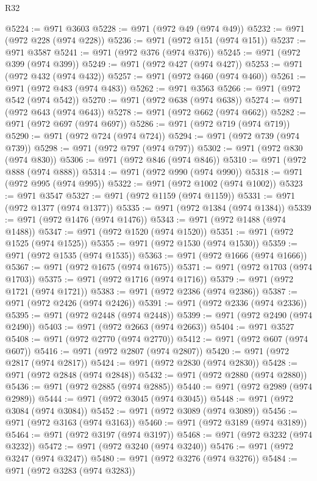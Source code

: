 \begin{lexlean}{R32}
\begin{coremodule}
@5224 := @971 @3603
@5228 := @971 (@972 @49 (@974 @49))
@5232 := @971 (@972 @228 (@974 @228))
@5236 := @971 (@972 @151 (@974 @151))
@5237 := @971 @3587
@5241 := @971 (@972 @376 (@974 @376))
@5245 := @971 (@972 @399 (@974 @399))
@5249 := @971 (@972 @427 (@974 @427))
@5253 := @971 (@972 @432 (@974 @432))
@5257 := @971 (@972 @460 (@974 @460))
@5261 := @971 (@972 @483 (@974 @483))
@5262 := @971 @3563
@5266 := @971 (@972 @542 (@974 @542))
@5270 := @971 (@972 @638 (@974 @638))
@5274 := @971 (@972 @643 (@974 @643))
@5278 := @971 (@972 @662 (@974 @662))
@5282 := @971 (@972 @697 (@974 @697))
@5286 := @971 (@972 @719 (@974 @719))
@5290 := @971 (@972 @724 (@974 @724))
@5294 := @971 (@972 @739 (@974 @739))
@5298 := @971 (@972 @797 (@974 @797))
@5302 := @971 (@972 @830 (@974 @830))
@5306 := @971 (@972 @846 (@974 @846))
@5310 := @971 (@972 @888 (@974 @888))
@5314 := @971 (@972 @990 (@974 @990))
@5318 := @971 (@972 @995 (@974 @995))
@5322 := @971 (@972 @1002 (@974 @1002))
@5323 := @971 @3547
@5327 := @971 (@972 @1159 (@974 @1159))
@5331 := @971 (@972 @1377 (@974 @1377))
@5335 := @971 (@972 @1384 (@974 @1384))
@5339 := @971 (@972 @1476 (@974 @1476))
@5343 := @971 (@972 @1488 (@974 @1488))
@5347 := @971 (@972 @1520 (@974 @1520))
@5351 := @971 (@972 @1525 (@974 @1525))
@5355 := @971 (@972 @1530 (@974 @1530))
@5359 := @971 (@972 @1535 (@974 @1535))
@5363 := @971 (@972 @1666 (@974 @1666))
@5367 := @971 (@972 @1675 (@974 @1675))
@5371 := @971 (@972 @1703 (@974 @1703))
@5375 := @971 (@972 @1716 (@974 @1716))
@5379 := @971 (@972 @1721 (@974 @1721))
@5383 := @971 (@972 @2386 (@974 @2386))
@5387 := @971 (@972 @2426 (@974 @2426))
@5391 := @971 (@972 @2336 (@974 @2336))
@5395 := @971 (@972 @2448 (@974 @2448))
@5399 := @971 (@972 @2490 (@974 @2490))
@5403 := @971 (@972 @2663 (@974 @2663))
@5404 := @971 @3527
@5408 := @971 (@972 @2770 (@974 @2770))
@5412 := @971 (@972 @607 (@974 @607))
@5416 := @971 (@972 @2807 (@974 @2807))
@5420 := @971 (@972 @2817 (@974 @2817))
@5424 := @971 (@972 @2830 (@974 @2830))
@5428 := @971 (@972 @2848 (@974 @2848))
@5432 := @971 (@972 @2880 (@974 @2880))
@5436 := @971 (@972 @2885 (@974 @2885))
@5440 := @971 (@972 @2989 (@974 @2989))
@5444 := @971 (@972 @3045 (@974 @3045))
@5448 := @971 (@972 @3084 (@974 @3084))
@5452 := @971 (@972 @3089 (@974 @3089))
@5456 := @971 (@972 @3163 (@974 @3163))
@5460 := @971 (@972 @3189 (@974 @3189))
@5464 := @971 (@972 @3197 (@974 @3197))
@5468 := @971 (@972 @3232 (@974 @3232))
@5472 := @971 (@972 @3240 (@974 @3240))
@5476 := @971 (@972 @3247 (@974 @3247))
@5480 := @971 (@972 @3276 (@974 @3276))
@5484 := @971 (@972 @3283 (@974 @3283))

\end{coremodule}
\end{lexlean}
